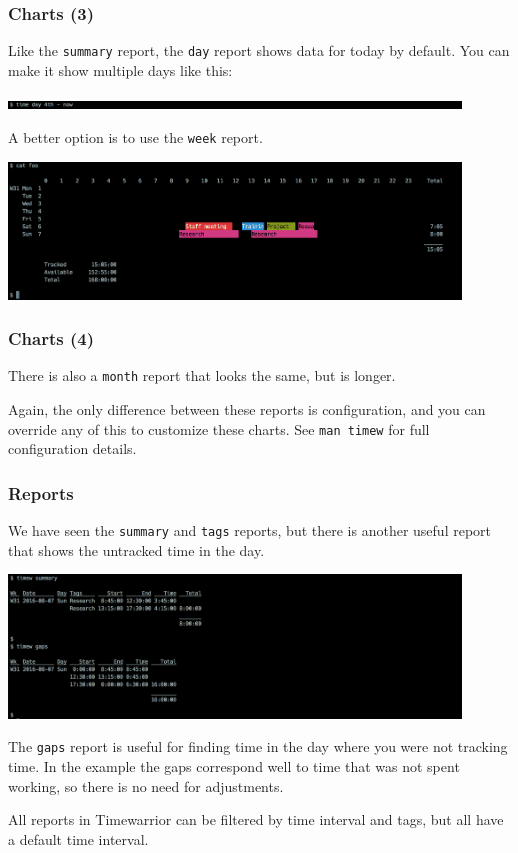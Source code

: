 \documentclass[t,handout]{beamer}
\begin{document}
\begin{frame}[fragile]\frametitle{Charts (3)}
    Like the \verb=summary= report, the \verb=day= report shows data for today by default. You can make it show multiple days like this:

    \includegraphics[width=12cm]{images/tutorial27.png}

    A better option is to use the \verb=week= report.

    \includegraphics[width=12cm]{images/tutorial28.png}
\end{frame}

\begin{frame}[fragile]\frametitle{Charts (4)}
    There is also a \verb=month= report that looks the same, but is longer.

    Again, the only difference between these reports is configuration, and you can override any of this to customize these charts. See \verb=man timew= for full configuration details.
\end{frame}

\begin{frame}[fragile]\frametitle{Reports}
    We have seen the \verb=summary= and \verb=tags= reports, but there is another useful report that shows the untracked time in the day.

    \includegraphics[width=12cm]{images/tutorial29.png}

    The \verb=gaps= report is useful for finding time in the day where you were not tracking time. In the example the gaps correspond well to time that was not spent working, so there is no need for adjustments.

    All reports in Timewarrior can be filtered by time interval and tags, but all have a default time interval.
\end{frame}
\end{document}
